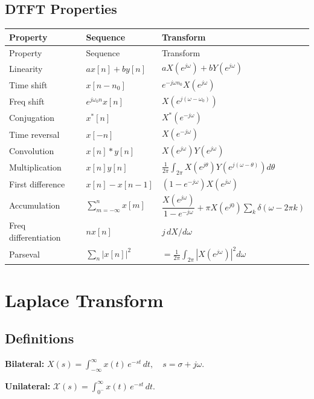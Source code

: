 \documentclass[10pt]{article}
\begin{document}
\subsection{DTFT Properties}
\begin{longtable}{@{}lll@{}}
\toprule Property & Sequence & Transform \\ \midrule \endfirsthead
\toprule Property & Sequence & Transform \\ \midrule \endhead
\bottomrule \endfoot
Linearity & $ax[n] + by[n]$ & $aX(e^{j\omega}) + bY(e^{j\omega})$ \\
Time shift & $x[n - n_0]$ & $e^{-j\omega n_0}X(e^{j\omega})$ \\
Freq shift & $e^{j\omega_0 n}x[n]$ & $X(e^{j(\omega - \omega_0)})$ \\
Conjugation & $x^*[n]$ & $X^*(e^{-j\omega})$ \\
Time reversal & $x[-n]$ & $X(e^{-j\omega})$ \\
Convolution & $x[n] * y[n]$ & $X(e^{j\omega})Y(e^{j\omega})$ \\
Multiplication & $x[n]y[n]$ & $\tfrac{1}{2\pi}\int_{2\pi} X(e^{j\theta})Y(e^{j(\omega-\theta)})d\theta$ \\
First difference & $x[n] - x[n-1]$ & $(1 - e^{-j\omega})X(e^{j\omega})$ \\
Accumulation & $\sum_{m=-\infty}^n x[m]$ & $\dfrac{X(e^{j\omega})}{1 - e^{-j\omega}} + \pi X(e^{j0})\sum_k\delta(\omega - 2\pi k)$ \\
Freq differentiation & $nx[n]$ & $j\,dX/d\omega$ \\
Parseval & $\sum_n |x[n]|^2$ & $=\tfrac{1}{2\pi}\int_{2\pi}|X(e^{j\omega})|^2 d\omega$ \\
\end{longtable}

\section{Laplace Transform}

\subsection{Definitions}
\textbf{Bilateral:} $\displaystyle X(s) = \int_{-\infty}^{\infty} x(t)\,e^{-st}\,dt,\quad s = \sigma + j\omega.$

\textbf{Unilateral:} $\displaystyle \mathcal{X}(s) = \int_{0^-}^{\infty} x(t)\,e^{-st}\,dt.$
\end{document}
